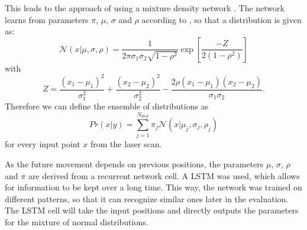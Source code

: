 This leads to the approach of using a mixture density network \cite{bishop1994mixture}. The network learns from parameters $\pi$, $\mu$, $\sigma$ and $\rho$ according to \cite{graves2013generating}, so that a distribution is given as:
\begin{equation}
	\mathcal{N}(x|\mu,\sigma,\rho) = \frac{1}{2\pi\sigma_1\sigma_2\sqrt{1-\rho^2}} \exp\left[ \frac{-Z}{2(1-\rho^2)} \right]
\end{equation}
with
\begin{equation}
	Z = \frac{(x_1 - \mu_1)^2}{\sigma_1^2} + \frac{(x_2 - \mu_2)^2}{\sigma_2^2} - \frac{2\rho(x_1-\mu_1)(x_2-\mu_2)}{\sigma_1\sigma_2}.
\end{equation}
Therefore we can define the ensemble of distributions as
\begin{equation}
	Pr(x|y) = \sum_{j=1}^{N_{dist}} \pi_j \mathcal{N}(x|\mu_j,\sigma_j,\rho_j)
\end{equation}
for every input point $x$ from the laser scan.

As the future movement depends on previous positions, the parameters $\mu$, $\sigma$, $\rho$ and $\pi$ are derived from a recurrent network cell. A LSTM was used, which allows for information to be kept over a long time. This way, the network was trained on different patterns, so that it can recognize similar ones later in the evaluation. The LSTM cell will take the input positions and directly outputs the parameters for the mixture of normal distributions.